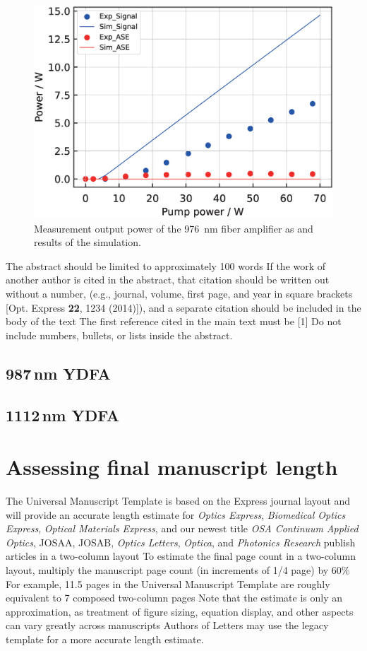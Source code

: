 \documentclass{osa-article}
\begin{document}
\begin{figure}[h!]
  \centering\includegraphics[width=0.5\linewidth]{./Figure/Yb1200-20-125DC-PM438mm_915Pump976Seed0.24W.eps}
  \caption{Measurement output power of the \SI{976}{nm} fiber amplifier as and results of the simulation.}
  \label{fig:1112YDFASystem}
\end{figure}

The abstract should be limited to approximately 100 words
If the work of another author is cited in the abstract, that citation should be written out without a number, (e.g., journal, volume, first page, and year in square brackets [Opt. Express {\bfseries 22}, 1234 (2014)]), and a separate citation should be included in the body of the text
The first reference cited in the main text must be [1]
Do not include numbers, bullets, or lists inside the abstract.

\subsection{987\,nm YDFA}


\subsection{1112\,nm YDFA}


\section{Assessing final manuscript length}
The Universal Manuscript Template is based on the Express journal layout and will provide an accurate length estimate for \emph{Optics Express}, \emph{Biomedical Optics Express},  \emph{Optical Materials Express}, and our newest title \emph{OSA Continuum}
\emph{Applied Optics}, JOSAA, JOSAB, \emph{Optics Letters}, \emph{Optica}, and \emph{Photonics Research} publish articles in a two-column layout
To estimate the final page count in a two-column layout, multiply the manuscript page count (in increments of 1/4 page) by 60\%
For example, 11.5 pages in the Universal Manuscript Template are roughly equivalent to 7 composed two-column pages
Note that the estimate is only an approximation, as treatment of figure sizing, equation display, and other aspects can vary greatly across manuscripts
Authors of Letters may use the legacy template for a more accurate length estimate.
\end{document}
